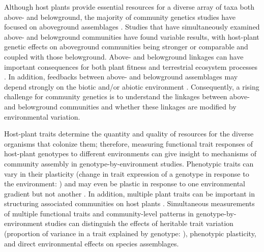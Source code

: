 \documentclass[11pt]{article}
\begin{document}
Although host plants provide essential resources for a diverse array of
taxa both above- and belowground, the majority of community genetics
studies have focused on aboveground assemblages \cite{Whitham_2012}.
Studies that have simultaneously examined above- and belowground
communities have found variable results, with host-plant genetic effects
on aboveground communities being stronger
\cite{Crutsinger_2008}\cite{Bailey_2009} or comparable and coupled
\cite{Crutsinger_2014} with those belowground. Above- and belowground
linkages can have important consequences for both plant fitness
\cite{Whitham_2006} and terrestrial ecosystem processes \cite{Wardle_2004}.
In addition, feedbacks between above- and belowground assemblages may
depend strongly on the biotic and/or abiotic environment
\cite{Wardle_2004}. Consequently, a rising challenge for community
genetics is to understand the linkages between above- and belowground
communities \cite{Crutsinger_2014}\cite{Lamit_2015} and whether these
linkages are modified by environmental variation.

Host-plant traits determine the quantity and quality of resources for
the diverse organisms that colonize them; therefore, measuring
functional trait responses of host-plant genotypes to different
environments can give insight to mechanisms of community assembly in
genotype-by-environment studies. Phenotypic traits can vary in their
plasticity (change in trait expression of a genotype in response to the
environment: \cite{Scheiner_1993}) and may even be plastic in response to
one environmental gradient but not another
\cite{Scheiner_1993}\cite{Scheiner_1984}\cite{Garbutt_1987}. In addition,
multiple plant traits can be important in structuring associated
communities on host plants
\cite{Barbour_2015}\cite{Barbour_2016}\cite{Agrawal_2006}\cite{agrawal2005natural}\cite{Agrawal_2004}.
Simultaneous measurements of multiple functional traits and
community-level patterns in genotype-by-environment studies can
distinguish the effects of heritable trait variation (proportion of
variance in a trait explained by genotype: \cite{lynch1998genetics}),
phenotypic plasticity, and direct environmental effects on species
assemblages.
\end{document}
